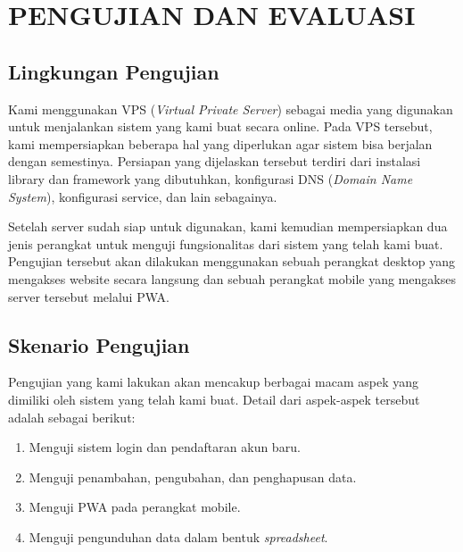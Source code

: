\chapter{PENGUJIAN DAN EVALUASI}
\vspace{4ex}

\setlength{\parindent}{7ex}


\section{Lingkungan Pengujian}
\vspace{1ex}

Kami menggunakan VPS (\emph{Virtual Private Server}) sebagai media yang digunakan untuk menjalankan sistem yang kami buat secara online.
Pada VPS tersebut, kami mempersiapkan beberapa hal yang diperlukan agar sistem bisa berjalan dengan semestinya.
Persiapan yang dijelaskan tersebut terdiri dari instalasi library dan framework yang dibutuhkan, konfigurasi DNS (\emph{Domain Name System}), konfigurasi service, dan lain sebagainya.
\vspace{0.5ex}

Setelah server sudah siap untuk digunakan, kami kemudian mempersiapkan dua jenis perangkat untuk menguji fungsionalitas dari sistem yang telah kami buat.
Pengujian tersebut akan dilakukan menggunakan sebuah perangkat desktop yang mengakses website secara langsung dan sebuah perangkat mobile yang mengakses server tersebut melalui PWA.
\vspace{0.5ex}

\section{Skenario Pengujian}
\vspace{1ex}

Pengujian yang kami lakukan akan mencakup berbagai macam aspek yang dimiliki oleh sistem yang telah kami buat.
Detail dari aspek-aspek tersebut adalah sebagai berikut:
\vspace{0.5ex}

\begin{enumerate}[nolistsep]

  \item Menguji sistem login dan pendaftaran akun baru.
  \vspace{0.5ex}

  \item Menguji penambahan, pengubahan, dan penghapusan data.
  \vspace{0.5ex}

  \item Menguji PWA pada perangkat mobile.
  \vspace{0.5ex}

  \item Menguji pengunduhan data dalam bentuk \emph{spreadsheet}.
  \vspace{0.5ex}

\end{enumerate}
\vspace{0.5ex}

